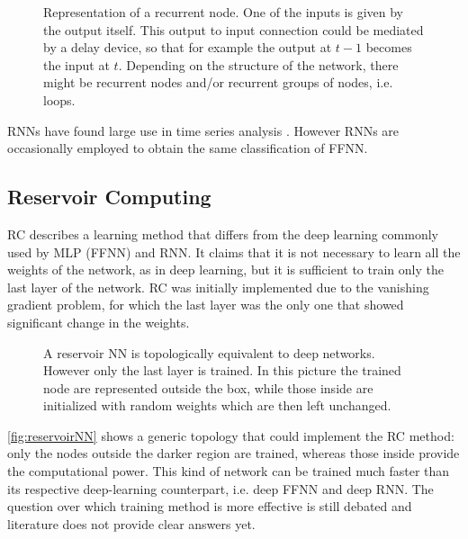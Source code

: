 \begin{figure}[ht]
	\centering
	
	\caption{%
		Representation of a recurrent node.
		One of the inputs is given by the output itself.
		This output to input connection could be mediated by a delay device, so that for example the output at $t-1$ becomes the input at $t$.
		Depending on the structure of the network, there might be recurrent nodes and/or recurrent groups of nodes, i.e. loops.
		}
	\label{fig:RecurrentNN}
\end{figure}

\acsp{RNN} have found large use in time series analysis \cite{duda2012pattern}.
However \acsp{RNN} are occasionally employed to obtain the same classification of \acs{FFNN}.

\subsection{Reservoir Computing}
\label{ssec:Reservoir_Computing}
\ac{RC} describes a learning method that differs from the deep learning commonly used by \acs{MLP} (\acs{FFNN}) and \acs{RNN}.
It claims that it is not necessary to learn all the weights of the network, as in deep learning, but it is sufficient to train only the last layer of the network.
\acs{RC} was initially implemented due to the vanishing gradient problem, for which the last layer was the only one that showed significant change in the weights.

\begin{figure}[ht]
	\centering
	
	\caption{A reservoir NN is topologically equivalent to deep networks. However only the last layer is trained. In this picture the trained node are represented outside the box, while those inside are initialized with random weights which are then left unchanged.}
	\label{fig:reservoirNN}
\end{figure}

\autoref{fig:reservoirNN} shows a generic topology that could implement the \acs{RC} method: only the nodes outside the darker region are trained, whereas those inside provide the computational power.
This kind of network can be trained much faster than its respective deep-learning counterpart, i.e. deep \acs{FFNN} and deep \acs{RNN}.
The question over which training method is more effective is still debated and literature does not provide clear answers yet.

